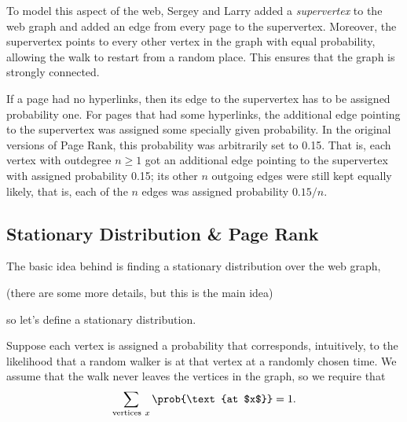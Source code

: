To model this aspect of the web, Sergey and Larry added a
\emph{supervertex} to the web graph and added an edge from every page
to the supervertex.  Moreover, the supervertex points to every other
vertex in the graph with equal probability, allowing the walk to
restart from a random place.  This ensures that the graph is strongly
connected.

If a page had no hyperlinks, then its edge to the supervertex has to
be assigned probability one.  For pages that had some hyperlinks, the
additional edge pointing to the supervertex was assigned some
specially given probability.  In the original versions of Page Rank,
this probability was arbitrarily set to 0.15.  That is, each vertex
with outdegree $n \ge 1$ got an additional edge pointing to the
supervertex with assigned probability 0.15; its other $n$ outgoing
edges were still kept equally likely, that is, each of the $n$ edges
was assigned probability $0.15/n$.

\begin{editingnotes}
\end{editingnotes}

\iffalse
For example, below left is a graph and below right is the same
graph after adding the supervertex $x_{N+1}$.

\bigskip\centerline{
  \resizebox{!}{1.3in}{\texttt{[image: randomWalkFigs/adjMatrix2]}}
  \hspace{2cm}
  \resizebox{!}{1.5in}{\texttt{[image: randomWalkFigs/sinkGraph]}}
}\bigskip

The addition of the supervertex also removes the possibility that the value
$1/\outdegr{x}$ might involve a division by zero.
\fi

\subsection{Stationary Distribution \& Page Rank}\label{stationary_sec}

The basic idea behind  is finding a stationary
distribution over the web graph,
\begin{editingnotes}
(there are some more details, but this is the main idea)
\end{editingnotes}
so let's define a stationary distribution.

Suppose each vertex is assigned a probability that corresponds, intuitively,
to the likelihood that a random walker is at that vertex at a randomly
chosen time.  We assume that the walk never leaves the vertices in the graph,
so we require that
\begin{equation}\label{LN12:sum1}
\sum_{\text{vertices}\ x} \prob{\text{at $x$}} = 1.
\end{equation}

